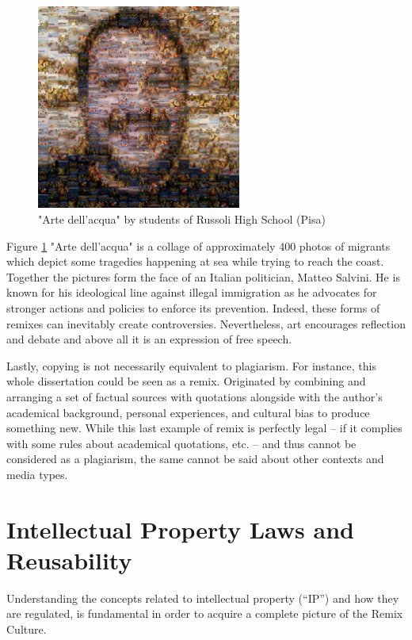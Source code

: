 \begin{figure}[H]
\centering
\includegraphics[width=0.6\textwidth]{images/arteAcquaSalvini.jpg}
\caption{"Arte dell'acqua" by students of Russoli High School (Pisa)}
\label{fig:arteAcqua}
\end{figure}

Figure \ref{fig:arteAcqua} "Arte dell'acqua" is a collage of approximately 400 photos of migrants which depict some tragedies happening at sea while trying to reach the coast. Together the pictures form the face of an Italian politician, Matteo Salvini. He is known for his ideological line against illegal immigration as he advocates for stronger actions and policies to enforce its prevention. Indeed, these forms of remixes can inevitably create controversies. Nevertheless, art encourages reflection and debate and above all it is an expression of free speech.

Lastly, copying is not necessarily equivalent to plagiarism. For instance, this whole dissertation could be seen as a remix. Originated by combining and arranging a set of factual sources with quotations alongside with the author’s academical background, personal experiences, and cultural bias to produce something new. 
While this last example of remix is perfectly legal – if it complies with some rules about academical quotations, etc. – and thus cannot be considered as a plagiarism, the same cannot be said about other contexts and media types.


\section{Intellectual Property Laws and Reusability}
\label{sec:IPR}

Understanding the concepts related to intellectual property (“IP”) and how they are regulated, is fundamental in order to acquire a complete picture of the Remix Culture.

